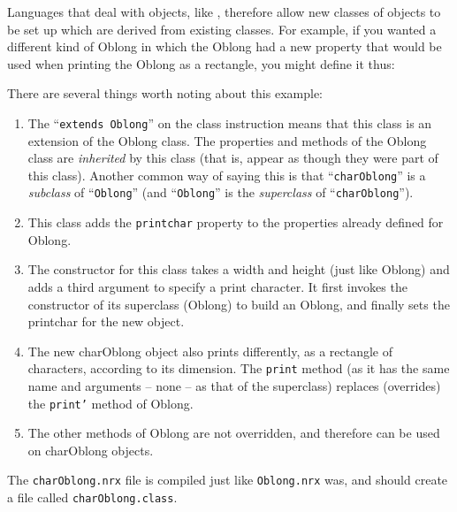 Languages that deal with objects, like \nr{}, therefore allow new
classes of objects to be set up which are derived from existing
classes. For example, if you wanted a different kind of Oblong in
which the Oblong had a new property that would be used when printing
the Oblong as a rectangle, you might define it thus:

There are several things worth noting about this example:
\begin{enumerate}
\item The “\texttt{extends Oblong}” on the class instruction means that this class is an extension of the Oblong class. The properties and methods of the Oblong class are \emph{inherited} by this class (that is, appear as though they were part of this class).
Another common way of saying this is that “\texttt{charOblong}” is a \emph{subclass} of “\texttt{Oblong}” (and “\texttt{Oblong}” is the \emph{superclass} of “\texttt{charOblong}”).
\item This class adds the \texttt{printchar} property to the properties already defined for Oblong.
\item The constructor for this class takes a width and height (just like Oblong) and adds a third argument to specify a print character. It first invokes the constructor of its superclass (Oblong) to build an Oblong, and finally sets the printchar for the new object.
\item The new charOblong object also prints differently, as a rectangle of characters, according to its dimension. The \texttt{print} method (as it has the same name and arguments – none – as that of the superclass) replaces (overrides) the \texttt{print'} method of Oblong.
\item The other methods of Oblong are not overridden, and therefore
  can be used on charOblong objects.
\end{enumerate}
The \texttt{charOblong.nrx} file is compiled just like \texttt{Oblong.nrx} was, and
should create a file called \texttt{charOblong.class}.

